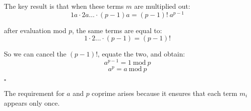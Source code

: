 \documentclass[11pt, oneside]{article}
\begin{document}
The key result is that when these terms $m$ are multiplied out:
\[ 1a \cdot 2a \dots \cdot (p-1)a = (p-1)! \ a^{p-1} \]

after evaluation mod $p$, the same terms are equal to:
\[ 1 \cdot 2 \dots \cdot (p-1)  = (p-1)! \]

So we can cancel the $(p-1)!$, equate the two, and obtain:
\[ a^{p-1} = 1 \ \text{mod} \ p \]
\[ a^{p} = a \ \text{mod} \ p \]

$\square$

The requirement for $a$ and $p$ coprime arises because it ensures that each term $m_i$ appears only once. 
\end{document}
